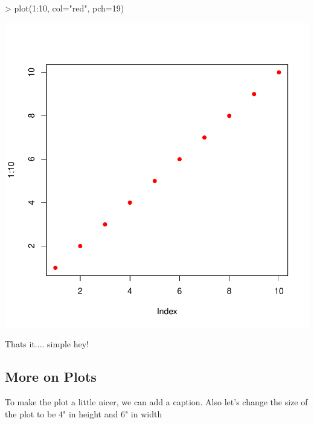 \documentclass{article}
\begin{document}
\begin{Schunk}
\begin{Sinput}
> plot(1:10, col="red", pch=19)
\end{Sinput}
\end{Schunk}
\includegraphics{Fig-test2}

Thats it.... simple hey!


\subsection{More on Plots}

To make the plot a little nicer, we can add a caption. Also let's change the size of the plot to be 4" in height and 6" in width
\end{document}
